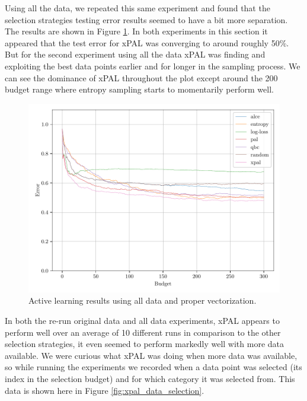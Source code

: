 Using all the data, we repeated this same experiment and found that the selection strategies testing error results seemed to have a bit more separation. The results are shown in Figure \ref{fig:probal_all_proper_vect}. In both experiments in this section it appeared that the test error for xPAL was converging to around roughly 50\%. But for the second experiment using all the data xPAL was finding and exploiting the best data points earlier and for longer in the sampling process. We can see the dominance of xPAL throughout the plot except around the 200 budget range where entropy sampling starts to momentarily perform well.

\begin{figure}[h]
  \centering
  \includegraphics[width=\scale\textwidth]{../img/plot_text_data_all_proper_vectorizer_test_results.pdf}
  \caption{Active learning results using all data and proper vectorization.}
  \label{fig:probal_all_proper_vect}
\end{figure}

In both the re-run original data and all data experiments, xPAL appears to perform well over an average of 10 different runs in comparison to the other selection strategies, it even seemed to perform markedly well with more data available. We were curious what xPAL was doing when more data was available, so while running the experiments we recorded when a data point was selected (its index in the selection budget) and for which category it was selected from. This data is shown here in Figure \ref{fig:xpal_data_selection}.

